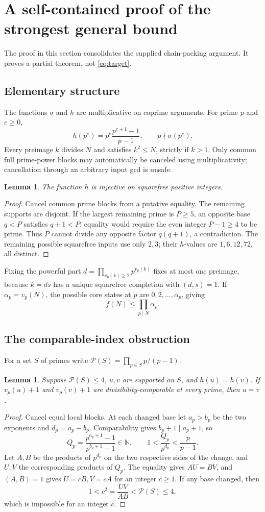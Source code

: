 \documentclass[11pt,a4paper]{article}
\newtheorem{lemma}[theorem]{Lemma}
\theoremstyle{remark}
\newcommand{\PP}{\mathcal P}
\newcommand{\NN}{\mathbb N}
\begin{document}
\section{A self-contained proof of the strongest general bound}
The proof in this section consolidates the supplied chain-packing argument.
It proves a partial theorem, not \eqref{eq:target}.

\subsection{Elementary structure}
The functions $\sigma$ and $h$ are multiplicative on coprime arguments. For
prime $p$ and $e\ge0$,
\[
 h(p^e)=p^e\frac{p^{e+1}-1}{p-1},\qquad p\nmid\sigma(p^e).
\]
Every preimage $k$ divides $N$ and satisfies $k^2\le N$, strictly if $k>1$.
Only common full prime-power blocks may automatically be canceled using
multiplicativity; cancellation through an arbitrary input gcd is unsafe.

\begin{lemma}\label{lem:squarefree}
The function $h$ is injective on squarefree positive integers.
\end{lemma}
\begin{proof}
Cancel common prime blocks from a putative equality. The remaining supports
are disjoint. If the largest remaining prime is $P\ge5$, an opposite base
$q<P$ satisfies $q+1<P$: equality would require the even integer $P-1\ge4$
to be prime. Thus $P$ cannot divide any opposite factor $q(q+1)$, a
contradiction. The remaining possible squarefree inputs use only $2,3$;
their $h$-values are $1,6,12,72$, all distinct.
\end{proof}

Fixing the powerful part $d=\prod_{v_p(k)\ge2}p^{v_p(k)}$ fixes at most one
preimage, because $k=ds$ has a unique squarefree completion with $(d,s)=1$.
If $\alpha_p=v_p(N)$, the possible core states at $p$ are
$0,2,\ldots,\alpha_p$, giving
\[
 f(N)\le\prod_{p\mid N}\alpha_p.
\]

\subsection{The comparable-index obstruction}
For a set $S$ of primes write $\PP(S)=\prod_{p\in S}p/(p-1)$.

\begin{lemma}\label{lem:comparable}
Suppose $\PP(S)\le4$, $u,v$ are supported on $S$, and $h(u)=h(v)$.
If $v_p(u)+1$ and $v_p(v)+1$ are divisibility-comparable at every prime,
then $u=v$.
\end{lemma}
\begin{proof}
Cancel equal local blocks. At each changed base let $a_p>b_p$ be the two
exponents and $d_p=a_p-b_p$. Comparability gives $b_p+1\mid a_p+1$, so
\[
 Q_p=\frac{p^{a_p+1}-1}{p^{b_p+1}-1}\in\NN,
 \qquad 1<\frac{Q_p}{p^{d_p}}<\frac p{p-1}.
\]
Let $A,B$ be the products of $p^{d_p}$ on the two respective sides of the
change, and $U,V$ the corresponding products of $Q_p$. The equality gives
$AU=BV$, and $(A,B)=1$ gives $U=cB,V=cA$ for an integer $c\ge1$.
If any base changed, then
\[
 1<c^2=\frac{UV}{AB}<\PP(S)\le4,
\]
which is impossible for an integer $c$.
\end{proof}
\end{document}
